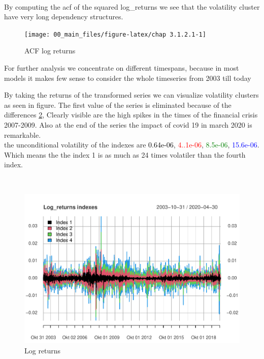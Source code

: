 \documentclass[
]{article}
\begin{document}
~

By computing the acf of the squared log\_returns we see that the
volatility cluster have very long dependency structures.

\begin{figure}

{\centering \texttt{[image: 00\_main\_files/figure-latex/chap 3.1.2.1-1]} 

}

\caption{ACF log returns}\label{fig:chap 3.1.2.1}
\end{figure}

For further analysis we concentrate on different timespans, because in
most models it makes few sense to consider the whole timeseries from
2003 till today

By taking the returns of the transformed series we can visualize
volatility clusters as seen in figure. The first value of the series is
eliminated because of the differences \ref{fig:chap3.1.3}, Clearly
visible are the high spikes in the times of the financial crisis
2007-2009. Also at the end of the series the impact of covid 19 in march
2020 is remarkable.\\
the unconditional volatility of the indexes are
\textcolor{black}{0.64e-06}, \textcolor{red}{4..1e-06},
\textcolor{green}{8.5e-06}, \textcolor{blue}{15.6e-06}. Which means the
the index 1 is as much as 24 times volatiler than the fourth index.

~

\begin{figure}

{\centering \includegraphics[width=0.7\linewidth]{00_main_files/figure-latex/chap3.1.3-1} 

}

\caption{Log returns}\label{fig:chap3.1.3}
\end{figure}

\newpage
\end{document}
